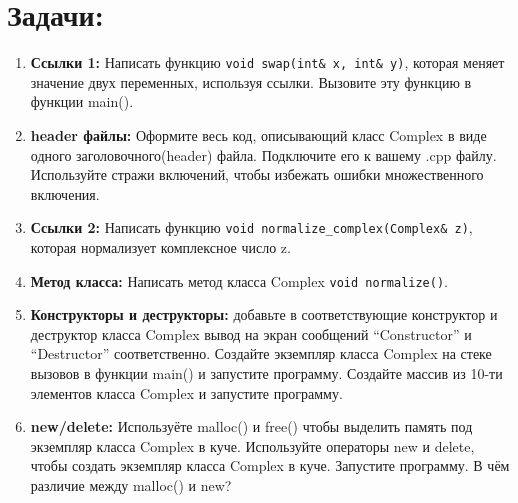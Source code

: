 \documentclass{article}
\begin{document}



\section*{Задачи:}
\begin{enumerate}
\item \textbf{Ссылки 1:} Написать функцию \texttt{void swap(int\& x, int\& y)}, которая меняет значение двух переменных, используя ссылки. Вызовите эту функцию в функции main().
\item \textbf{header файлы:} Оформите весь код, описывающий класс Complex в виде одного заголовочного(header) файла. Подключите его к вашему .cpp файлу. Используйте стражи включений, чтобы избежать ошибки множественного включения.
\item \textbf{Ссылки 2:} Написать функцию \texttt{void normalize\_complex(Complex\& z)}, которая нормализует комплексное число z.
\item \textbf{Метод класса:} Написать метод класса Complex \texttt{void normalize()}.
\item \textbf{Конструкторы и деструкторы:} добавьте в соответствующие конструктор и деструктор класса Complex вывод на экран сообщений ``Constructor'' и ``Destructor'' соответственно. Создайте экземпляр класса Complex на стеке вызовов в функции main() и запустите программу. Создайте массив из 10-ти элементов класса Complex и запустите программу.
\item \textbf{new/delete:}  Используёте malloc() и free() чтобы выделить память под экземпляр класса Complex в куче. Используйте операторы new и delete, чтобы создать экземпляр класса Complex в куче. Запустите программу. В чём различие между malloc() и new?
\end{enumerate}
\end{document}
